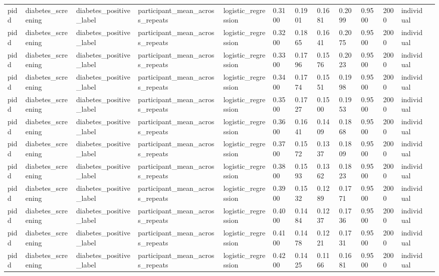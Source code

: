 \begin{tabular}{lllllllllllll}
pidd & diabetes\_screening & diabetes\_positive\_label & participant\_mean\_across\_repeats & logistic\_regression & 0.3100 & 0.1901 & 0.1681 & 0.2099 & 0.9500 & 2000 & individual &  \\
pidd & diabetes\_screening & diabetes\_positive\_label & participant\_mean\_across\_repeats & logistic\_regression & 0.3200 & 0.1865 & 0.1641 & 0.2075 & 0.9500 & 2000 & individual &  \\
pidd & diabetes\_screening & diabetes\_positive\_label & participant\_mean\_across\_repeats & logistic\_regression & 0.3300 & 0.1796 & 0.1576 & 0.2023 & 0.9500 & 2000 & individual &  \\
pidd & diabetes\_screening & diabetes\_positive\_label & participant\_mean\_across\_repeats & logistic\_regression & 0.3400 & 0.1774 & 0.1551 & 0.1998 & 0.9500 & 2000 & individual &  \\
pidd & diabetes\_screening & diabetes\_positive\_label & participant\_mean\_across\_repeats & logistic\_regression & 0.3500 & 0.1727 & 0.1500 & 0.1953 & 0.9500 & 2000 & individual &  \\
pidd & diabetes\_screening & diabetes\_positive\_label & participant\_mean\_across\_repeats & logistic\_regression & 0.3600 & 0.1641 & 0.1409 & 0.1868 & 0.9500 & 2000 & individual &  \\
pidd & diabetes\_screening & diabetes\_positive\_label & participant\_mean\_across\_repeats & logistic\_regression & 0.3700 & 0.1572 & 0.1337 & 0.1809 & 0.9500 & 2000 & individual &  \\
pidd & diabetes\_screening & diabetes\_positive\_label & participant\_mean\_across\_repeats & logistic\_regression & 0.3800 & 0.1593 & 0.1362 & 0.1823 & 0.9500 & 2000 & individual &  \\
pidd & diabetes\_screening & diabetes\_positive\_label & participant\_mean\_across\_repeats & logistic\_regression & 0.3900 & 0.1532 & 0.1289 & 0.1771 & 0.9500 & 2000 & individual &  \\
pidd & diabetes\_screening & diabetes\_positive\_label & participant\_mean\_across\_repeats & logistic\_regression & 0.4000 & 0.1484 & 0.1237 & 0.1736 & 0.9500 & 2000 & individual &  \\
pidd & diabetes\_screening & diabetes\_positive\_label & participant\_mean\_across\_repeats & logistic\_regression & 0.4100 & 0.1478 & 0.1221 & 0.1731 & 0.9500 & 2000 & individual &  \\
pidd & diabetes\_screening & diabetes\_positive\_label & participant\_mean\_across\_repeats & logistic\_regression & 0.4200 & 0.1425 & 0.1166 & 0.1681 & 0.9500 & 2000 & individual &  \\

\end{tabular}
